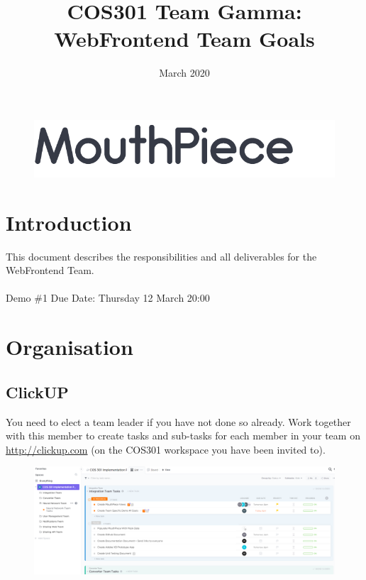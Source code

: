 \documentclass{article}
\begin{document}
\title{COS301 Team Gamma: WebFrontend Team Goals}
\begin{figure}
    \centering
    \includegraphics[width=\textwidth]{logo.png}
\end{figure}
\date{March 2020}

\maketitle

\section{Introduction}
This document describes the responsibilities and all deliverables for the \\ WebFrontend Team.
\\ \\
Demo \#1 Due Date: Thursday 12 March 20:00
\newpage

\section{Organisation}
\subsection{ClickUP}
You need to elect a team leader if you have not done so already. Work together with this member to create tasks and sub-tasks for each member in your team on \url{http://clickup.com} (on the COS301 workspace you have been invited to). \\

\begin{figure}[h]
    \centering
    \includegraphics[width=\textwidth]{clickup.png}
\end{figure}
\end{document}
